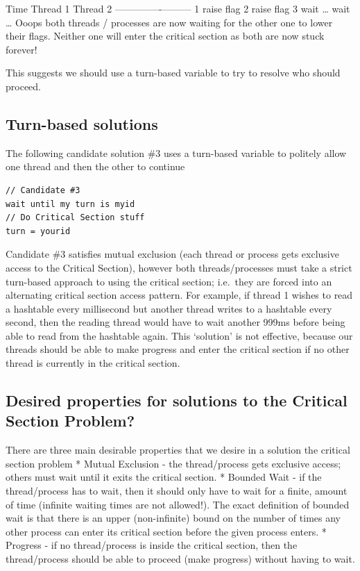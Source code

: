 Time \textbar{} Thread 1 \textbar{} Thread 2 -----\textbar{}----------\textbar{}--------- 1 \textbar{} raise flag 2 \textbar{} \textbar{} raise flag 3 \textbar{} wait \ldots{} \textbar{} wait \ldots{} Ooops both threads / processes are now waiting for the other one to lower their flags. Neither one will enter the critical section as both are now stuck forever!

This suggests we should use a turn-based variable to try to resolve who should proceed.

\subsection{Turn-based solutions}\label{turn-based-solutions}

The following candidate solution \#3 uses a turn-based variable to politely allow one thread and then the other to continue

\begin{lstlisting}
// Candidate #3
wait until my turn is myid
// Do Critical Section stuff
turn = yourid
\end{lstlisting}

Candidate \#3 satisfies mutual exclusion (each thread or process gets exclusive access to the Critical Section), however both threads/processes must take a strict turn-based approach to using the critical section; i.e.~they are forced into an alternating critical section access pattern. For example, if thread 1 wishes to read a hashtable every millisecond but another thread writes to a hashtable every second, then the reading thread would have to wait another 999ms before being able to read from the hashtable again. This `solution' is not effective, because our threads should be able to make progress and enter the critical section if no other thread is currently in the critical section.

\subsection{Desired properties for solutions to the Critical Section Problem?}\label{desired-properties-for-solutions-to-the-critical-section-problem}

There are three main desirable properties that we desire in a solution the critical section problem * Mutual Exclusion - the thread/process gets exclusive access; others must wait until it exits the critical section. * Bounded Wait - if the thread/process has to wait, then it should only have to wait for a finite, amount of time (infinite waiting times are not allowed!). The exact definition of bounded wait is that there is an upper (non-infinite) bound on the number of times any other process can enter its critical section before the given process enters. * Progress - if no thread/process is inside the critical section, then the thread/process should be able to proceed (make progress) without having to wait.

